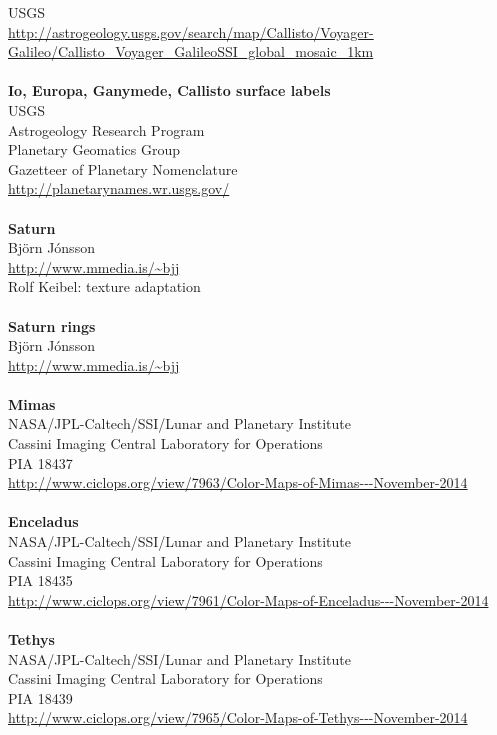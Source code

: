 \documentclass[Orbiter User Manual.tex]{subfiles}
\begin{document}
USGS\\
\url{http://astrogeology.usgs.gov/search/map/Callisto/Voyager-Galileo/Callisto_Voyager_GalileoSSI_global_mosaic_1km}\\
\\
\textbf{Io, Europa, Ganymede, Callisto surface labels}\\
USGS\\
Astrogeology Research Program\\
Planetary Geomatics Group\\
Gazetteer of Planetary Nomenclature\\
\url{http://planetarynames.wr.usgs.gov/}\\
\\
\textbf{Saturn}\\
Björn Jónsson\\
\url{http://www.mmedia.is/~bjj}\\
Rolf Keibel: texture adaptation\\
\\
\textbf{Saturn rings}\\
Björn Jónsson\\
\url{http://www.mmedia.is/~bjj}\\
\\
\textbf{Mimas}\\
NASA/JPL-Caltech/SSI/Lunar and Planetary Institute\\
Cassini Imaging Central Laboratory for Operations\\
PIA 18437\\
\url{http://www.ciclops.org/view/7963/Color-Maps-of-Mimas---November-2014}\\
\\
\textbf{Enceladus}\\
NASA/JPL-Caltech/SSI/Lunar and Planetary Institute\\
Cassini Imaging Central Laboratory for Operations\\
PIA 18435\\
\url{http://www.ciclops.org/view/7961/Color-Maps-of-Enceladus---November-2014}\\
\\
\textbf{Tethys}\\
NASA/JPL-Caltech/SSI/Lunar and Planetary Institute\\
Cassini Imaging Central Laboratory for Operations\\
PIA 18439\\
\url{http://www.ciclops.org/view/7965/Color-Maps-of-Tethys---November-2014}\\
\end{document}
